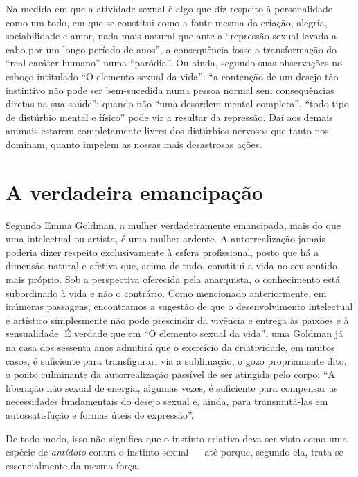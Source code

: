 Na medida em que a
atividade sexual é algo que diz respeito à personalidade como um todo,
em que se constitui como a fonte mesma da criação, alegria,
sociabilidade e amor, nada mais natural que ante a ``repressão sexual
levada a cabo por um longo período de anos'', a consequência fosse
a transformação do ``real caráter humano'' numa
``paródia''. Ou ainda, segundo suas observações no esboço intitulado ``O
elemento sexual da vida'': ``a contenção de um desejo tão instintivo não
pode ser bem-sucedida numa pessoa normal sem consequências diretas na
sua saúde''; quando não ``uma desordem mental completa'', ``todo tipo de
distúrbio mental e físico'' pode vir a resultar da repressão. Daí aos
demais animais estarem completamente livres dos distúrbios nervosos que
tanto nos dominam, quanto impelem as nossas mais desastrosas ações.

\section{A verdadeira emancipação}

Segundo Emma Goldman, a mulher verdadeiramente emancipada, mais do que
uma intelectual ou artista, é uma mulher ardente. A autorrealização
jamais poderia dizer respeito exclusivamente à esfera profissional,
posto que há a dimensão natural e afetiva que, acima de tudo, constitui
a vida no seu sentido mais próprio. Sob a perspectiva oferecida pela
anarquista, o conhecimento está subordinado à vida e não o contrário.
Como mencionado anteriormente, em inúmeras passagens, encontramos a
sugestão de que o desenvolvimento intelectual e artístico simplesmente
não pode prescindir da vivência e entrega às paixões e à sensualidade. É
verdade que em ``O elemento sexual da vida'', uma Goldman já na casa dos
sessenta anos admitirá que o exercício da criatividade, em muitos
casos, é suficiente para transfigurar, via a sublimação, o gozo
propriamente dito, o ponto culminante da autorrealização passível de ser
atingida pelo corpo: ``A liberação não sexual de energia, algumas vezes,
é suficiente para compensar as necessidades fundamentais do desejo
sexual e, ainda, para transmutá-las em autossatisfação e formas úteis de
expressão''.

De todo modo, isso não significa que o instinto
criativo deva ser visto como uma espécie de \textit{antídoto} contra o
instinto sexual --- até porque, segundo ela, trata-se essencialmente da
mesma força. 

